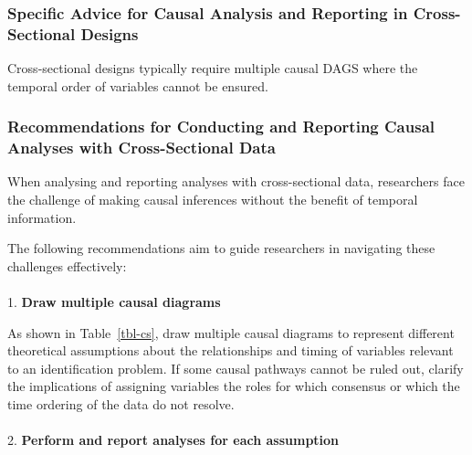 \documentclass[
  singlecolumn]{article}
\makeatletter
\let\oldparagraph\paragraph
\renewcommand{\paragraph}{
    \@ifstar
      \xxxParagraphStar
      \xxxParagraphNoStar
  }
\newcommand{\xxxParagraphStar}[1]{\oldparagraph*{#1}\mbox{}}
\newcommand{\xxxParagraphNoStar}[1]{\oldparagraph{#1}\mbox{}}
\makeatother
\begin{document}
\subsubsection{Specific Advice for Causal Analysis and Reporting in
Cross-Sectional
Designs}\label{specific-advice-for-causal-analysis-and-reporting-in-cross-sectional-designs}

\begin{table}

\caption{\label{tbl-cs}Cross-sectional designs typically require
multiple causal DAGS where the temporal order of variables cannot be
ensured.}

\centering{

\examplecrosssection

}

\end{table}%

\subsubsection{Recommendations for Conducting and Reporting Causal
Analyses with Cross-Sectional
Data}\label{recommendations-for-conducting-and-reporting-causal-analyses-with-cross-sectional-data}

When analysing and reporting analyses with cross-sectional data,
researchers face the challenge of making causal inferences without the
benefit of temporal information.

The following recommendations aim to guide researchers in navigating
these challenges effectively:

\paragraph{\texorpdfstring{1. \textbf{Draw multiple causal
diagrams}}{1. Draw multiple causal diagrams}}\label{draw-multiple-causal-diagrams}

As shown in Table~\ref{tbl-cs}, draw multiple causal diagrams to
represent different theoretical assumptions about the relationships and
timing of variables relevant to an identification problem. If some
causal pathways cannot be ruled out, clarify the implications of
assigning variables the roles for which consensus or which the time
ordering of the data do not resolve.

\paragraph{\texorpdfstring{2. \textbf{Perform and report analyses for
each
assumption}}{2. Perform and report analyses for each assumption}}\label{perform-and-report-analyses-for-each-assumption}
\end{document}

